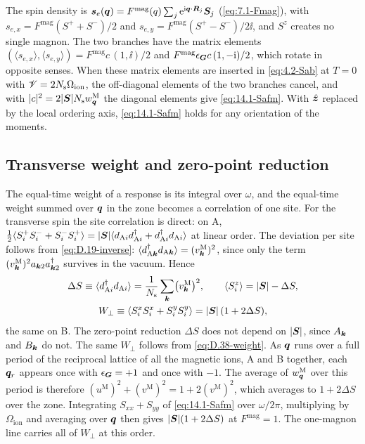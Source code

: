 The spin density is $\bm{s}_e(\bm{q}) = F^{\mathrm{mag}}(q)\sum_j\mathrm{e}^{\mathrm{i}\bm{q}\cdot\bm{R}_j}\bm{S}_j$ (\cref{eq:7.1-Fmag}), with $s_{e,x} = F^{\mathrm{mag}}(S^+ + S^-)/2$ and $s_{e,y} = F^{\mathrm{mag}}(S^+ - S^-)/2\ii$, and $S^z$ creates no single magnon. The two branches have the matrix elements $(\langle s_{e,x}\rangle, \langle s_{e,y}\rangle) = F^{\mathrm{mag}}c\,(1, \ii)/2$ and $F^{\mathrm{mag}}\epsilon_{\bm{G}}c\,(1, -\mathrm{i})/2$, which rotate in opposite senses. When these matrix elements are inserted in \cref{eq:4.2-Sab} at $T = 0$ with $\mathscr{V} = 2N_{\mathrm{s}}\Omega_{\mathrm{ion}}$, the off-diagonal elements of the two branches cancel, and with $|c|^2 = 2|\bm{S}|N_{\mathrm{s}}w^{\mathrm{M}}_{\bm{q}}$ the diagonal elements give \cref{eq:14.1-Safm}. With $\hat{\bm{z}}$ replaced by the local ordering axis, \cref{eq:14.1-Safm} holds for any orientation of the moments.

\subsection*{Transverse weight and zero-point reduction}

The equal-time weight of a response is its integral over $\omega$, and the equal-time weight summed over $\bm{q}$ in the zone becomes a correlation of one site. For the transverse spin the site correlation is direct: on A, $\frac12\langle S^+_iS^-_i + S^-_iS^+_i\rangle = |\bm{S}|\langle d_{\mathrm{A}i}d^\dagger_{\mathrm{A}i} + d^\dagger_{\mathrm{A}i}d_{\mathrm{A}i}\rangle$ at linear order. The deviation per site follows from \cref{eq:D.19-inverse}: $\langle d^\dagger_{\mathrm{A}\bm{k}}d_{\mathrm{A}\bm{k}}\rangle = (v^{\mathrm{M}}_{\bm{k}})^2$, since only the term $(v^{\mathrm{M}}_{\bm{k}})^2a_{\bm{k}2}a^\dagger_{\bm{k}2}$ survives in the vacuum. Hence
\begin{equation}
  \begin{gathered}
  \Delta S \equiv \langle d^\dagger_{\mathrm{A}i}d_{\mathrm{A}i}\rangle = \frac{1}{N_{\mathrm{s}}}\sum_{\bm{k}}\bigl(v^{\mathrm{M}}_{\bm{k}}\bigr)^2, \qquad
  \langle S^z_i\rangle = |\bm{S}| - \Delta S, \\
  W_\perp \equiv \langle S^x_iS^x_i + S^y_iS^y_i\rangle = |\bm{S}|\,(1 + 2\Delta S) ,
  \end{gathered}
  \label{eq:D.38-Wperp}
\end{equation}
the same on B. The zero-point reduction $\Delta S$ does not depend on $|\bm{S}|$, since $A_{\bm{k}}$ and $B_{\bm{k}}$ do not. The same $W_\perp$ follows from \cref{eq:D.38-weight}. As $\bm{q}$ runs over a full period of the reciprocal lattice of all the magnetic ions, A and B together, each $\bm{q}_r$ appears once with $\epsilon_{\bm{G}} = +1$ and once with $-1$. The average of $w^{\mathrm{M}}_{\bm{q}}$ over this period is therefore $(u^{\mathrm{M}})^2 + (v^{\mathrm{M}})^2 = 1 + 2(v^{\mathrm{M}})^2$, which averages to $1 + 2\Delta S$ over the zone. Integrating $S_{xx} + S_{yy}$ of \cref{eq:14.1-Safm} over $\omega/2\pi$, multiplying by $\Omega_{\mathrm{ion}}$ and averaging over $\bm{q}$ then gives $|\bm{S}|(1 + 2\Delta S)$ at $F^{\mathrm{mag}} = 1$. The one-magnon line carries all of $W_\perp$ at this order.

